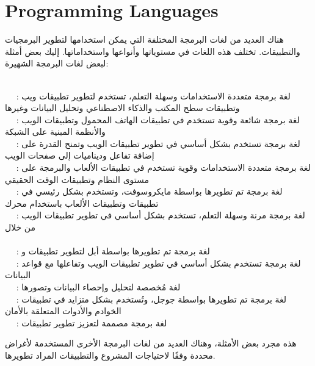   \section{Programming Languages}
  \begin{AR}
    هناك العديد من لغات البرمجة المختلفة التي يمكن استخدامها لتطوير البرمجيات والتطبيقات. تختلف هذه اللغات في مستوياتها وأنواعها واستخداماتها. إليك بعض أمثلة لبعض لغات البرمجة الشهيرة:

\\
\ \ \LR{\textcolor{theme}{- 1}}     : لغة برمجة متعددة الاستخدامات وسهلة التعلم، تستخدم لتطوير تطبيقات ويب وتطبيقات سطح المكتب والذكاء الاصطناعي وتحليل البيانات وغيرها
\\
\ \ \LR{\textcolor{theme}{- 2}}     : لغة برمجة شائعة وقوية تستخدم في تطبيقات الهاتف المحمول وتطبيقات الويب والأنظمة المبنية على الشبكة
\\
\ \ \LR{\textcolor{theme}{- 3}}     : لغة برمجة تستخدم بشكل أساسي في تطوير تطبيقات الويب وتمنح القدرة على إضافة تفاعل وديناميات إلى صفحات الويب
\\
\ \ \LR{\textcolor{theme}{- 4}}     : لغة برمجة متعددة الاستخدامات وقوية تستخدم في تطبيقات الألعاب والبرمجة على مستوى النظام وتطبيقات الوقت الحقيقي
\\
\ \ \LR{\textcolor{theme}{- 5}}     : لغة برمجة تم تطويرها بواسطة مايكروسوفت، وتستخدم بشكل رئيسي في تطبيقات  وتطبيقات الألعاب باستخدام محرك 
\\
\ \ \LR{\textcolor{theme}{- 6}}     : لغة برمجة مرنة وسهلة التعلم، تستخدم بشكل أساسي في تطوير تطبيقات الويب من خلال \\ 
\\
\ \ \LR{\textcolor{theme}{- 7}}     : لغة برمجة تم تطويرها بواسطة أبل لتطوير تطبيقات  و 
\\
\ \ \LR{\textcolor{theme}{- 8}}     : لغة برمجة تستخدم بشكل أساسي في تطوير تطبيقات الويب وتفاعلها مع قواعد البيانات
\\
\ \ \LR{\textcolor{theme}{- 9}}     : لغة مُخصصة لتحليل وإحصاء البيانات وتصورها
\\
\ \ \LR{\textcolor{theme}{- 10}}     : لغة برمجة تم تطويرها بواسطة جوجل، وتُستخدم بشكل متزايد في تطبيقات الخوادم والأدوات المتعلقة بالأمان
\\
\ \ \LR{\textcolor{theme}{- 11}}     : لغة برمجة مصممة لتعزيز تطوير تطبيقات 

    هذه مجرد بعض الأمثلة، وهناك العديد من لغات البرمجة الأخرى المستخدمة لأغراض محددة وفقًا لاحتياجات المشروع والتطبيقات المراد تطويرها.
  \end{AR}
